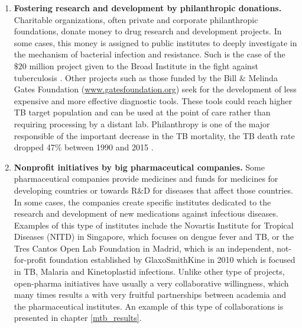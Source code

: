 \documentclass[12pt, b5paper,twoside]{tesi_upf}
\begin{document}
\begin{enumerate}

\item \textbf{Fostering research and development by philanthropic donations.} Charitable organizations, often private and corporate philanthropic foundations, donate money to drug research and development projects. In some cases, this money is assigned to public institutes to deeply investigate in the mechanism of bacterial infection and resistance. Such is the case of the $\$20$ million  project given to the Broad Institute in the fight against tuberculosis \cite{BroadInstitute}. Other projects such as those funded by the Bill $\&$ Melinda Gates Foundation (\url{www.gatesfoundation.org}) seek for the development of less expensive and more effective diagnostic tools. These tools could reach higher TB target population and can be used at the point of care rather than requiring processing by a distant lab. Philanthropy is one of the major responsible of the important decrease in the TB mortality, the TB death rate dropped 47$\%$ between 1990 and 2015 \cite{Lewandowski2015}. 

\item \textbf{Nonprofit initiatives by big pharmaceutical companies.} Some pharmaceutical companies provide medicines and funds for medicines for developing countries or towards R$\&$D for diseases that affect those countries. In some cases, the companies create specific institutes dedicated to the research and development of new medications against infectious diseases. Examples of this type of institutes include the Novartis Institute for Tropical Diseases (NITD) in Singapore, which focuses on dengue fever and TB, or the Tres Cantos Open Lab Foundation in Madrid, which is an independent, not-for-profit foundation established by GlaxoSmithKine in 2010 which is focused in TB, Malaria and Kinetoplastid infections. Unlike other type of projects, open-pharma initiatives have usually a very collaborative willingness, which many times results a with very fruitful partnerships between academia and the pharmaceutical institutes. An example of this type of collaborations is presented in chapter \ref{mtb_results}.


\end{enumerate}
\end{document}
